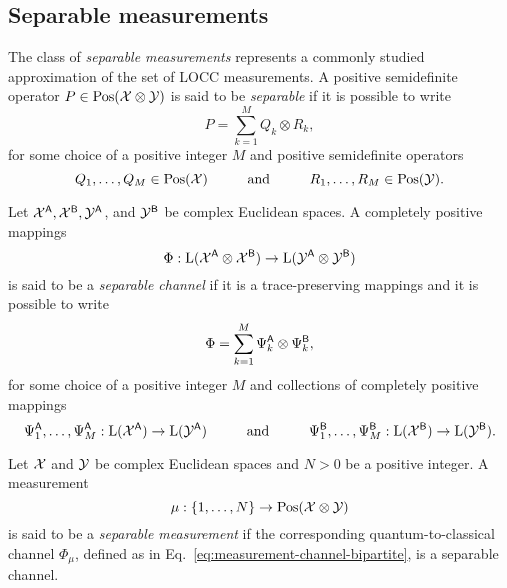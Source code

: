 \subsection{Separable measurements}

The class of \emph{separable measurements} represents a commonly studied
approximation of the set of LOCC measurements.
A positive semidefinite operator $P\in\mathrm{Pos}(\mathcal{X}\otimes\mathcal{Y})$ is said to be
\emph{separable} if it is possible to write
\begin{equation}
  P = \sum_{k = 1}^{M} Q_k \otimes R_k,
\end{equation}
for some choice of a positive integer $M$ and positive semidefinite operators
\begin{equation}
  Q_1,\ldots,Q_M \in \mathrm{Pos}(\mathcal{X})
  \hspace*{1cm}\mbox{and}\hspace*{1cm}
  R_1,\ldots,R_M\in\mathrm{Pos}(\mathcal{Y}).
\end{equation}

\begin{definition}
Let $\mathcal{X}^{\mathsf{A}}, \mathcal{X}^{\mathsf{B}}, \mathcal{Y}^{\mathsf{A}}$, and $\mathcal{Y}^{\mathsf{B}}$ be complex
Euclidean spaces.
A completely positive mappings 
\[
  \Phi:\mathrm{L}(\mathcal{X}^{\mathsf{A}}\otimes\mathcal{X}^{\mathsf{B}})\to\mathrm{L}(\mathcal{Y}^{\mathsf{A}}\otimes\mathcal{Y}^{\mathsf{B}})
\]
is said to be a 
\emph{separable channel} if it is a trace-preserving mappings and it is possible 
to write
\begin{equation}
  \Phi = \sum_{k = 1}^{M}\Psi_{k}^{\mathsf{A}}\otimes\Psi_{k}^{\mathsf{B}},
\end{equation}
for some choice of a positive integer $M$ and collections of
completely positive mappings 
\begin{equation}
  \Psi_1^{\mathsf{A}},\ldots,\Psi_{M}^{\mathsf{A}} : \mathrm{L}(\mathcal{X}^{\mathsf{A}})\to\mathrm{L}(\mathcal{Y}^{\mathsf{A}})
  \hspace*{1cm}\mbox{and}\hspace*{1cm}
  \Psi_1^{\mathsf{B}},\ldots,\Psi_{M}^{\mathsf{B}} : \mathrm{L}(\mathcal{X}^{\mathsf{B}})\to\mathrm{L}(\mathcal{Y}^{\mathsf{B}}).
\end{equation}
\end{definition}

\begin{definition}
Let $\mathcal{X}$ and $\mathcal{Y}$ be complex Euclidean spaces and $N > 0$ be a positive integer. 
A measurement
\begin{equation}
  \mu: \{1, \ldots, N \} \rightarrow \mathrm{Pos}(\mathcal{X}\otimes\mathcal{Y})
\end{equation}
is said to be a \emph{separable measurement} if the 
corresponding quantum-to-classical channel $\Phi_{\mu}$, defined as in 
Eq.~\eqref{eq:measurement-channel-bipartite}, is a separable channel.
\end{definition}

